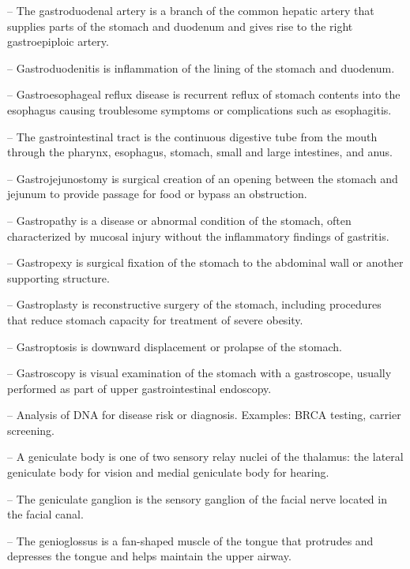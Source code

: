 -- The gastroduodenal artery is a branch of the common hepatic artery that supplies parts of the stomach and duodenum and gives rise to the right gastroepiploic artery.

-- Gastroduodenitis is inflammation of the lining of the stomach and duodenum.

-- Gastroesophageal reflux disease is recurrent reflux of stomach contents into the esophagus causing troublesome symptoms or complications such as esophagitis.

-- The gastrointestinal tract is the continuous digestive tube from the mouth through the pharynx, esophagus, stomach, small and large intestines, and anus.

-- Gastrojejunostomy is surgical creation of an opening between the stomach and jejunum to provide passage for food or bypass an obstruction.

-- Gastropathy is a disease or abnormal condition of the stomach, often characterized by mucosal injury without the inflammatory findings of gastritis.

-- Gastropexy is surgical fixation of the stomach to the abdominal wall or another supporting structure.

-- Gastroplasty is reconstructive surgery of the stomach, including procedures that reduce stomach capacity for treatment of severe obesity.

-- Gastroptosis is downward displacement or prolapse of the stomach.

-- Gastroscopy is visual examination of the stomach with a gastroscope, usually performed as part of upper gastrointestinal endoscopy.

-- Analysis of DNA for disease risk or diagnosis. Examples: BRCA testing, carrier screening.

-- A geniculate body is one of two sensory relay nuclei of the thalamus: the lateral geniculate body for vision and medial geniculate body for hearing.

-- The geniculate ganglion is the sensory ganglion of the facial nerve located in the facial canal.

-- The genioglossus is a fan-shaped muscle of the tongue that protrudes and depresses the tongue and helps maintain the upper airway.

